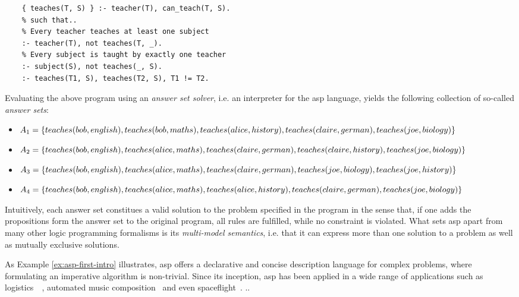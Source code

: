 \begin{example}
\begin{lstlisting}[style=asp-code, caption=School planning in ASP, label={lst:school-planning}]
    % Assign subjects to teachers
    { teaches(T, S) } :- teacher(T), can_teach(T, S).
    % such that..
    % Every teacher teaches at least one subject
    :- teacher(T), not teaches(T, _).
    % Every subject is taught by exactly one teacher
    :- subject(S), not teaches(_, S).
    :- teaches(T1, S), teaches(T2, S), T1 != T2.
\end{lstlisting}    
Evaluating the above program using an \emph{answer set solver}, i.e. an interpreter for the \gls{asp} language, yields the following collection of so-called \emph{answer sets}:
\begin{itemize}
    \item $A_1 = \{teaches(bob,english), teaches(bob,maths), teaches(alice,history),\\teaches(claire,german), teaches(joe,biology)\}$
    \item $A_2 = \{teaches(bob,english), teaches(alice,maths), teaches(claire,german),\\teaches(claire,history), teaches(joe,biology)\}$
    \item $A_3 = \{teaches(bob,english), teaches(alice,maths), teaches(claire,german),\\teaches(joe,biology), teaches(joe,history)\}$
    \item $A_4 = \{teaches(bob,english), teaches(alice,maths), teaches(alice,history),\\teaches(claire,german), teaches(joe,biology)\}$
\end{itemize}
Intuitively, each answer set constitues a valid solution to the problem specified in the program in the sense that, if one adds the propositions form the answer set to the original program, all rules are fulfilled, while no constraint is violated. What sets \gls{asp} apart from many other logic programming formalisms is its \emph{multi-model semantics}, i.e. that it can express more than one solution to a problem as well as mutually exclusive solutions.
\end{example}    

As Example \ref{ex:asp-first-intro} illustrates, \gls{asp} offers a declarative and concise description language for complex problems, where formulating an imperative algorithm is non-trivial. Since its inception, \gls{asp} has been applied in a wide range of applications such as logistics~\cite{gioia-tauro}~\cite{train-scheduling}, automated music composition~\cite{blues-composition} and even spaceflight~\cite{space-shuttle}.
..

